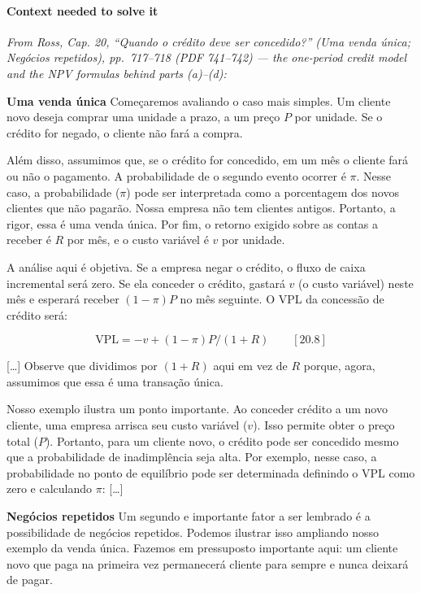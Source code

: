 \documentclass[11pt,a4paper]{article}
\begin{document}
\paragraph{Context needed to solve it}

\emph{From Ross, Cap. 20, ``Quando o crédito deve ser concedido?'' (Uma venda única; Negócios
repetidos), pp.~717--718 (PDF 741--742) --- the one-period credit model and the NPV formulas behind
parts (a)--(d):}

\textbf{Uma venda única} Começaremos avaliando o caso mais simples. Um cliente novo deseja comprar
uma unidade a prazo, a um preço \(P\) por unidade. Se o crédito for negado, o cliente não fará a
compra.

Além disso, assumimos que, se o crédito for concedido, em um mês o cliente fará ou não o pagamento.
A probabilidade de o segundo evento ocorrer é \(\pi\). Nesse caso, a probabilidade (\(\pi\)) pode
ser interpretada como a porcentagem dos novos clientes que não pagarão. Nossa empresa não tem
clientes antigos. Portanto, a rigor, essa é uma venda única. Por fim, o retorno exigido sobre as
contas a receber é \(R\) por mês, e o custo variável é \(v\) por unidade.

A análise aqui é objetiva. Se a empresa negar o crédito, o fluxo de caixa incremental será zero. Se
ela conceder o crédito, gastará \(v\) (o custo variável) neste mês e esperará receber \((1 - \pi)P\)
no mês seguinte. O VPL da concessão de crédito será:

\[\text{VPL} = -v + (1 - \pi)P/(1 + R) \qquad [20.8]\]

{[}\ldots{]} Observe que dividimos por \((1 + R)\) aqui em vez de \(R\) porque, agora, assumimos que
essa é uma transação única.

Nosso exemplo ilustra um ponto importante. Ao conceder crédito a um novo cliente, uma empresa
arrisca seu custo variável (\(v\)). Isso permite obter o preço total (\(P\)). Portanto, para um
cliente novo, o crédito pode ser concedido mesmo que a probabilidade de inadimplência seja alta. Por
exemplo, nesse caso, a probabilidade no ponto de equilíbrio pode ser determinada definindo o VPL
como zero e calculando \(\pi\): {[}\ldots{]}

\textbf{Negócios repetidos} Um segundo e importante fator a ser lembrado é a possibilidade de
negócios repetidos. Podemos ilustrar isso ampliando nosso exemplo da venda única. Fazemos em
pressuposto importante aqui: um cliente novo que paga na primeira vez permanecerá cliente para
sempre e nunca deixará de pagar.
\end{document}
